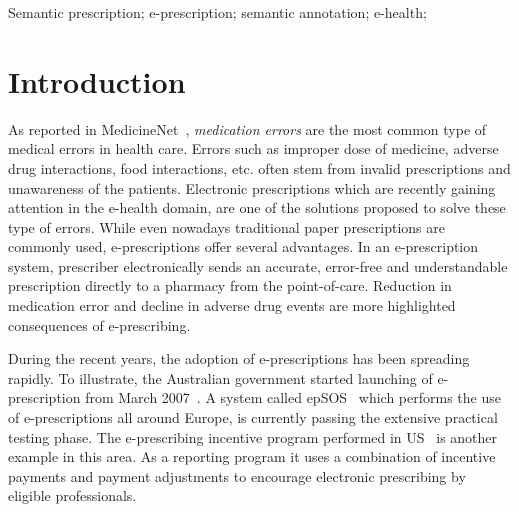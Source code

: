 \documentclass[10pt, conference, compsocconf]{IEEEtran}
\begin{document}
\begin{IEEEkeywords}
 Semantic prescription; e-prescription; semantic annotation; e-health;

\end{IEEEkeywords}


\IEEEpeerreviewmaketitle



\section{Introduction}
\label{intro}

As reported in MedicineNet~\cite{medicationErrors}, \emph{medication errors} are the most common type of medical errors in health care.
Errors such as improper dose of medicine, adverse drug interactions, food interactions, etc. often stem from invalid prescriptions and unawareness of the patients.
Electronic prescriptions which are recently gaining attention in the e-health domain, are one of the solutions proposed to solve these type of errors.
While even nowadays traditional paper prescriptions are commonly used, e-prescriptions offer several advantages.
In an e-prescription system, prescriber electronically sends an accurate, error-free and understandable prescription directly to a pharmacy from the point-of-care.
Reduction in medication error and decline in adverse drug events are more highlighted consequences of e-prescribing.

During the recent years, the adoption of e-prescriptions has been spreading rapidly.
To illustrate, the Australian government started launching of e-prescription from March 2007~\cite{medicare}.
A system called epSOS~\cite{epsos} which performs the use of e-prescriptions all around Europe, is currently passing the extensive practical testing phase.
The e-prescribing incentive program performed in US~\cite{epincentive} is another example in this area.
As a reporting program it uses a combination of incentive payments and payment adjustments to encourage electronic prescribing by eligible professionals.
\end{document}
